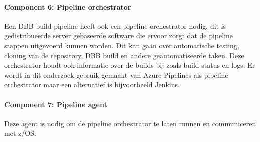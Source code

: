 \paragraph{Component 6: Pipeline orchestrator}
Een DBB build pipeline heeft ook een pipeline orchestrator nodig, dit is gedistribueerde server gebaseerde software die ervoor zorgt dat de pipeline stappen uitgevoerd kunnen worden. Dit kan gaan over automatische testing, cloning van de repository, DBB build en andere geautomatiseerde taken. Deze orchestrator houdt ook informatie over de builds bij zoals build status en logs. Er wordt in dit onderzoek gebruik gemaakt van Azure Pipelines als pipeline orchestrator maar een alternatief is bijvoorbeeld Jenkins.
\paragraph{Component 7: Pipeline agent}
Deze agent is nodig om de pipeline orchestrator te laten runnen en communiceren met z/OS.
